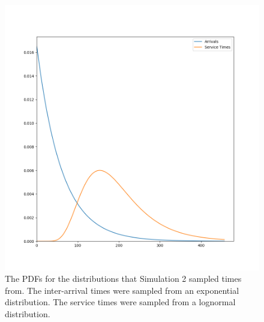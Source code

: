 \begin{figure}[H]
  \includegraphics[width=\textwidth]{figures/montecarlo/expon_lognorm.png}
  \caption{
    The PDFs for the distributions that Simulation 2
    sampled times from.
    The inter-arrival times were sampled from an exponential distribution.
    The service times were sampled from a lognormal distribution.
  }\label{fig:simple_sim2_dists}
\end{figure}


